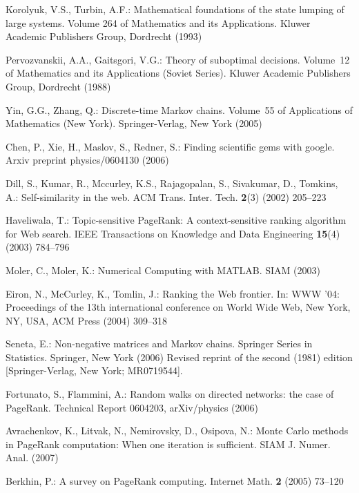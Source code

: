 \documentclass{article}
\begin{document}
\begin{thebibliography}{10}
Korolyuk, V.S., Turbin, A.F.:
\newblock Mathematical foundations of the state lumping of large systems.
  Volume 264 of Mathematics and its Applications.
\newblock Kluwer Academic Publishers Group, Dordrecht (1993)

Pervozvanskii, A.A., Gaitsgori, V.G.:
\newblock Theory of suboptimal decisions. Volume~12 of Mathematics and its
  Applications (Soviet Series).
\newblock Kluwer Academic Publishers Group, Dordrecht (1988)

Yin, G.G., Zhang, Q.:
\newblock Discrete-time {M}arkov chains. Volume~55 of Applications of
  Mathematics (New York).
\newblock Springer-Verlag, New York (2005)

Chen, P., Xie, H., Maslov, S., Redner, S.:
\newblock Finding scientific gems with google.
\newblock Arxiv preprint physics/0604130 (2006)

Dill, S., Kumar, R., Mccurley, K.S., Rajagopalan, S., Sivakumar, D., Tomkins,
  A.:
\newblock Self-similarity in the web.
\newblock ACM Trans. Inter. Tech. \textbf{2}(3) (2002)  205--223

Haveliwala, T.:
\newblock Topic-sensitive {P}age{R}ank: A context-sensitive ranking algorithm
  for {W}eb search.
\newblock IEEE Transactions on Knowledge and Data Engineering \textbf{15}(4)
  (2003)  784--796

Moler, C., Moler, K.:
\newblock Numerical Computing with MATLAB.
\newblock SIAM (2003)

Eiron, N., McCurley, K., Tomlin, J.:
\newblock Ranking the {W}eb frontier.
\newblock In: WWW '04: Proceedings of the 13th international conference on
  World Wide Web, New York, NY, USA, ACM Press (2004)  309--318

Seneta, E.:
\newblock Non-negative matrices and {M}arkov chains.
\newblock Springer Series in Statistics. Springer, New York (2006) Revised
  reprint of the second (1981) edition [Springer-Verlag, New York; MR0719544].

Fortunato, S., Flammini, A.:
\newblock Random walks on directed networks: the case of {P}age{R}ank.
\newblock Technical Report 0604203, arXiv/physics (2006)

Avrachenkov, K., Litvak, N., Nemirovsky, D., Osipova, N.:
\newblock Monte {C}arlo methods in {P}age{R}ank computation: When one iteration
  is sufficient.
\newblock SIAM J. Numer. Anal. (2007)

Berkhin, P.:
\newblock A survey on {P}age{R}ank computing.
\newblock Internet Math. \textbf{2} (2005)  73--120

\end{thebibliography}
\end{document}
